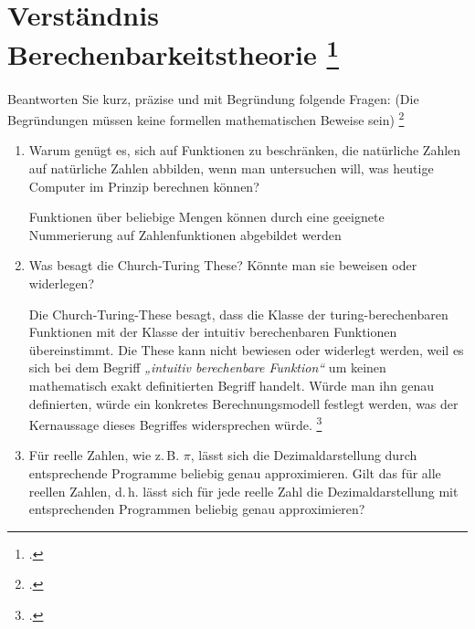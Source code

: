 \documentclass{lehramt-informatik-aufgabe}
\begin{document}
\section{Verständnis Berechenbarkeitstheorie
\footcite{66115:2016:03}}

Beantworten Sie kurz, präzise und mit Begründung folgende Fragen: (Die
Begründungen müssen keine formellen mathematischen Beweise sein)
\footcite[Aufgabe 9: F2016T2A2 (Check-Up)]{theo:ab:4}

\begin{enumerate}


\item Warum genügt es, sich auf Funktionen zu beschränken, die
natürliche Zahlen auf natürliche Zahlen abbilden, wenn man untersuchen
will, was heutige Computer im Prinzip berechnen können?

\begin{liAntwort}
Funktionen über beliebige Mengen können durch eine geeignete
Nummerierung auf Zahlenfunktionen abgebildet werden
\end{liAntwort}


\item Was besagt die Church-Turing These? Könnte man sie beweisen oder
widerlegen?

\begin{liAntwort}
Die Church-Turing-These besagt, dass die Klasse der turing-berechenbaren
Funktionen mit der Klasse der intuitiv berechenbaren Funktionen
übereinstimmt. Die These kann nicht bewiesen oder widerlegt werden, weil
es sich bei dem Begriff \emph{„intuitiv berechenbare Funktion“} um
keinen mathematisch exakt definitierten Begriff handelt. Würde man ihn
genau definierten, würde ein konkretes Berechnungsmodell festlegt
werden, was der Kernaussage dieses Begriffes widersprechen würde.
\footcite[Seite 308, These 6.1]{hoffmann}
\end{liAntwort}


\item Für reelle Zahlen, wie z.\,B. $\pi$, lässt sich die
Dezimaldarstellung durch entsprechende Programme beliebig genau
approximieren. Gilt das für alle reellen Zahlen, d.\,h. lässt sich für
jede reelle Zahl die Dezimaldarstellung mit entsprechenden Programmen
beliebig genau approximieren?


\end{enumerate}
\end{document}
